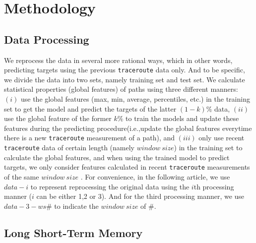 \documentclass[sigconf]{acmart}
\begin{document}
	\section{Methodology}
	\subsection{Data Processing}
	We reprocess the data in several more rational ways, which in other words, predicting targets using the previous \texttt{traceroute} data only. And to be specific, we divide the data into two sets, namely training set and test set. We calculate statistical properties (global features) of paths using three different manners: $(i)$ use the global features (max, min, average, percentiles, etc.) in the training set to get the model and predict the targets of the latter $(1-k)\%$ data, $(ii)$ use the global feature of the former $k\%$ to train the models and update these features during the predicting procedure(i.e.,update the global features everytime there is a new \texttt{traceroute} measurement of a path), and $(iii)$ only use recent \texttt{traceroute} data of certain length (namely $window\ size$) in the training set to calculate the global features, and when using the trained model to predict targets, we only consider features calculated in  recent \texttt{traceroute} measurements of the same $window\ size$ . For convenience, in the following article, we use $data-i$ to represent reprocessing the original data using the $i$th processing manner ($i$ can be either 1,2 or 3). And for the third processing manner, we use $data-3-ws\#$ to indicate the $window\ size$ of $\#$.
	
	\subsection{Long Short-Term Memory}
	
\end{document}
